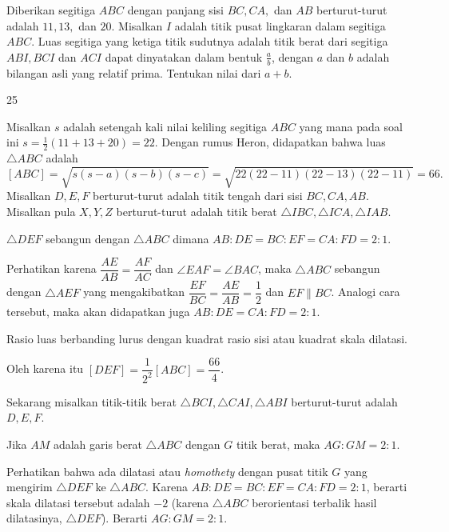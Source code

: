 \documentclass[12pt]{scrartcl}
\begin{document}
	\begin{soaljawab}
		Diberikan segitiga $ABC$ dengan panjang sisi $BC,CA,$ dan $AB$ berturut-turut adalah $11,13,$ dan $20$. Misalkan $I$ adalah titik pusat lingkaran dalam segitiga $ABC$. Luas segitiga yang ketiga titik sudutnya adalah titik berat dari segitiga $ABI,BCI$ dan $ACI$ dapat dinyatakan dalam bentuk $\frac{a}{b}$, dengan $a$ dan $b$ adalah bilangan asli yang relatif prima. Tentukan nilai dari $a+b$.
		
		\begin{jawaban}
		25
		\end{jawaban}
		\begin{solusi}
		Misalkan $s$ adalah setengah kali nilai keliling segitiga $ABC$ yang mana pada soal ini $s = \frac12(11+13+20) = 22$. Dengan rumus Heron, didapatkan bahwa luas $\triangle ABC$ adalah $$[ABC]=\sqrt{s(s-a)(s-b)(s-c)}=\sqrt{22(22-11)(22-13)(22-11)}=66.$$
		Misalkan $D,E,F$ berturut-turut adalah titik tengah dari sisi $BC,CA,AB$. Misalkan pula $X,Y,Z$ berturut-turut adalah titik berat $\triangle IBC,\triangle ICA,\triangle IAB$.
		\begin{lemmarev}[1]
				$\triangle DEF$ sebangun dengan $\triangle ABC$ dimana $AB:DE=BC:EF=CA:FD=2:1$.
				
				\begin{buktilemma}
					Perhatikan karena $\dfrac{AE}{AB}=\dfrac{AF}{AC}$ dan $\angle EAF = \angle BAC$, maka $\triangle ABC$ sebangun dengan $\triangle AEF$ yang mengakibatkan $\dfrac{EF}{BC}=\dfrac{AE}{AB}=\dfrac{1}{2}$ dan $EF \parallel BC$. Analogi cara tersebut, maka akan didapatkan juga $AB:DE=CA:FD=2:1$.
				\end{buktilemma}
			\end{lemmarev}
		
		
		\begin{lemmarev}[2]
				Rasio luas berbanding lurus dengan kuadrat rasio sisi atau kuadrat skala dilatasi.
		\end{lemmarev}
		Oleh karena itu  $[DEF]=\dfrac{1}{2^2}[ABC]=\dfrac{66}{4}$.
		
		Sekarang misalkan titik-titik berat $\triangle BCI, \triangle CAI, \triangle ABI$ berturut-turut adalah $D,E,F$. 
		
		\begin{lemmarev}[3]
			Jika $AM$ adalah garis berat $\triangle ABC$ dengan $G$ titik berat, maka $AG:GM = 2:1$.
			\begin{buktilemma}
			Perhatikan bahwa ada dilatasi atau \textit{ homothety } dengan pusat titik $G$ yang mengirim $\triangle DEF$ ke $\triangle ABC$. Karena $AB:DE=BC:EF=CA:FD=2:1$, berarti skala dilatasi tersebut adalah $-2$ (karena $\triangle ABC$ berorientasi terbalik hasil dilatasinya, $\triangle DEF$). Berarti $AG:GM=2:1$.
			\end{buktilemma}
		\end{lemmarev}
		

\end{solusi}
\end{soaljawab}
\end{document}
